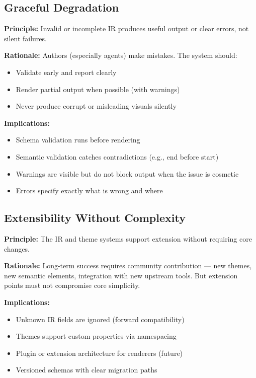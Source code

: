 \subsection{Graceful Degradation}
\label{principle:graceful-degradation}

\textbf{Principle:} Invalid or incomplete IR produces useful output or clear errors, not silent failures.

\textbf{Rationale:} Authors (especially agents) make mistakes. The system should:
\begin{itemize}
  \item Validate early and report clearly
  \item Render partial output when possible (with warnings)
  \item Never produce corrupt or misleading visuals silently
\end{itemize}

\textbf{Implications:}
\begin{itemize}
  \item Schema validation runs before rendering
  \item Semantic validation catches contradictions (e.g., end before start)
  \item Warnings are visible but do not block output when the issue is cosmetic
  \item Errors specify exactly what is wrong and where
\end{itemize}

\subsection{Extensibility Without Complexity}
\label{principle:extensibility}

\textbf{Principle:} The IR and theme systems support extension without requiring core changes.

\textbf{Rationale:} Long-term success requires community contribution — new themes, new semantic elements, integration with new upstream tools. But extension points must not compromise core simplicity.

\textbf{Implications:}
\begin{itemize}
  \item Unknown IR fields are ignored (forward compatibility)
  \item Themes support custom properties via namespacing
  \item Plugin or extension architecture for renderers (future)
  \item Versioned schemas with clear migration paths
\end{itemize}

